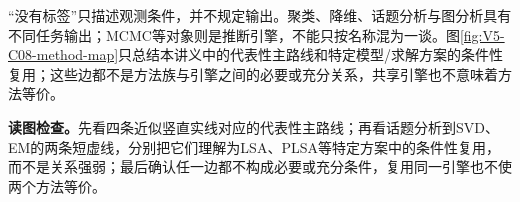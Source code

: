 \documentclass[UTF8,a4paper,11pt,openany]{ctexbook}
\begin{document}
\setcounter{page}{733}
\setcounter{chapter}{37}
\setcounter{section}{1}
\setcounter{figure}{1}
\pagestyle{headings}
“没有标签”只描述观测条件，并不规定输出。聚类、降维、话题分析与图分析具有不同任务输出；MCMC等对象则是推断引擎，不能只按名称混为一谈。图\ref{fig:V5-C08-method-map}只总结本讲义中的代表性主路线和特定模型/求解方案的条件性复用；这些边都不是方法族与引擎之间的必要或充分关系，共享引擎也不意味着方法等价。

\FloatBarrier
\noindent\textbf{读图检查。}先看四条近似竖直实线对应的代表性主路线；再看话题分析到SVD、EM的两条短虚线，分别把它们理解为LSA、PLSA等特定方案中的条件性复用，而不是关系强弱；最后确认任一边都不构成必要或充分条件，复用同一引擎也不使两个方法等价。
\end{document}
